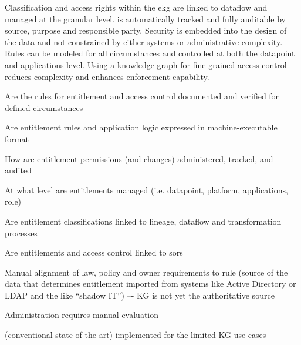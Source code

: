 %
%

\ekgmmCapabilitySectionContributionToEnterprise

Classification and access rights within the \gls{ekg} are linked to dataflow and managed at the granular level.
 is automatically tracked and fully auditable by source, purpose and responsible party.
Security is embedded into the design of the data and not constrained by either systems or administrative complexity.
Rules can be modeled for all circumstances and controlled at both the datapoint and applications level.
Using a knowledge graph for fine-grained access control reduces complexity and enhances enforcement capability.

\ekgmmCapabilitySectionDimensions

\begin{core-questions}

  \item [\thesection.1] Are the rules for entitlement and access control documented and verified for defined circumstances
  \item [\thesection.2] Are entitlement rules and application logic expressed in machine-executable format
  \item [\thesection.3] How are entitlement permissions (and changes) administered, tracked, and audited
  \item [\thesection.4] At what level are entitlements managed (i.e. datapoint, platform, applications, role)
  \item [\thesection.5] Are entitlement classifications linked to lineage, dataflow and transformation processes
  \item [\thesection.6] Are entitlements and access control linked to \glspl{sor}

\end{core-questions}

\ekgmmCapabilitySectionLevelsOneFive

\ekgmmscoringlevelOne

\begin{scoring}

  \item Manual alignment of law, policy and owner requirements to rule (source of the data that determines entitlement
        imported from systems like Active Directory or LDAP and the like “shadow IT”) –-
        KG is not yet the authoritative source
  \item Administration requires manual evaluation
  \item {} (conventional state of the art) implemented for the limited KG use cases

\end{scoring}

